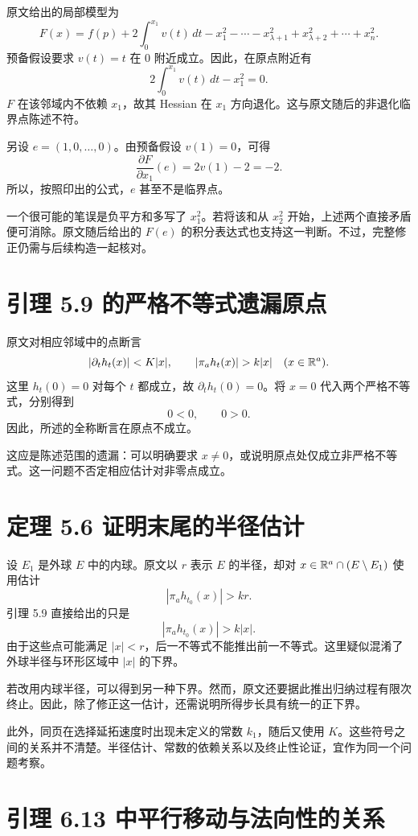 原文给出的局部模型为
\[
F(x)=f(p)+2\int_0^{x_1}v(t)\,dt
-x_1^2-\cdots-x_{\lambda+1}^2
+x_{\lambda+2}^2+\cdots+x_n^2.
\]
预备假设要求 $v(t)=t$ 在 $0$ 附近成立。因此，在原点附近有
\[
2\int_0^{x_1}v(t)\,dt-x_1^2=0.
\]
$F$ 在该邻域内不依赖 $x_1$，故其 Hessian 在 $x_1$ 方向退化。这与原文随后的非退化临界点陈述不符。

另设 $e=(1,0,\ldots,0)$。由预备假设 $v(1)=0$，可得
\[
\frac{\partial F}{\partial x_1}(e)=2v(1)-2=-2.
\]
所以，按照印出的公式，$e$ 甚至不是临界点。

一个很可能的笔误是负平方和多写了 $x_1^2$。若将该和从 $x_2^2$ 开始，上述两个直接矛盾便可消除。原文随后给出的 $F(e)$ 的积分表达式也支持这一判断。不过，完整修正仍需与后续构造一起核对。

\section*{引理 5.9 的严格不等式遗漏原点}

原文对相应邻域中的点断言
\[
|\partial_t h_t(x)|<K|x|,
\qquad
|\pi_a h_t(x)|>k|x|\quad(x\in\R^a).
\]
这里 $h_t(0)=0$ 对每个 $t$ 都成立，故 $\partial_t h_t(0)=0$。将 $x=0$ 代入两个严格不等式，分别得到
\[
0<0,\qquad 0>0.
\]
因此，所述的全称断言在原点不成立。

这应是陈述范围的遗漏：可以明确要求 $x\ne0$，或说明原点处仅成立非严格不等式。这一问题不否定相应估计对非零点成立。


\section*{定理 5.6 证明末尾的半径估计}

设 $E_1$ 是外球 $E$ 中的内球。原文以 $r$ 表示 $E$ 的半径，却对
$x\in\mathbb{R}^a\cap(E\setminus E_1)$ 使用估计
\[
|\pi_a h_{t_0}(x)|>kr.
\]
引理 5.9 直接给出的只是
\[
|\pi_a h_{t_0}(x)|>k|x|.
\]
由于这些点可能满足 $|x|<r$，后一不等式不能推出前一不等式。这里疑似混淆了外球半径与环形区域中 $|x|$ 的下界。

若改用内球半径，可以得到另一种下界。然而，原文还要据此推出归纳过程有限次终止。因此，除了修正这一估计，还需说明所得步长具有统一的正下界。

此外，同页在选择延拓速度时出现未定义的常数 $k_1$，随后又使用 $K$。这些符号之间的关系并不清楚。半径估计、常数的依赖关系以及终止性论证，宜作为同一个问题考察。

\section*{引理 6.13 中平行移动与法向性的关系}

